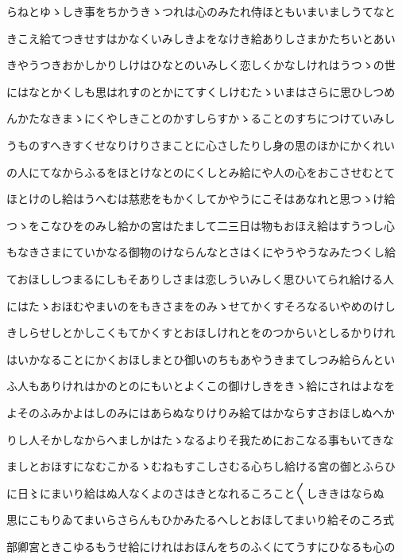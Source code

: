 \documentclass[a4paper,11pt,landscape]{ltjtarticle}
\begin{document}
らねとゆゝしき事をちかうきゝつれは心のみたれ侍ほともいまいましうてなと
\par\medskip
きこえ給てつきせすはかなくいみしきよをなけき給ありしさまかたちいとあい
\par\medskip
きやうつきおかしかりしけはひなとのいみしく恋しくかなしけれはうつゝの世
\par\medskip
にはなとかくしも思はれすのとかにてすくしけむたゝいまはさらに思ひしつめ
\par\medskip
んかたなきまゝにくやしきことのかすしらすかゝることのすちにつけていみし
\par\medskip
うものすへきすくせなりけりさまことに心さしたりし身の思のほかにかくれい
\par\medskip
の人にてなからふるをほとけなとのにくしとみ給にや人の心をおこさせむとて
\par\medskip
ほとけのし給はうへむは慈悲をもかくしてかやうにこそはあなれと思つゝけ給
\par\medskip
つゝをこなひをのみし給かの宮はたまして二三日は物もおほえ給はすうつし心
\par\medskip
もなきさまにていかなる御物のけならんなとさはくにやうやうなみたつくし給
\par\medskip
ておほししつまるにしもそありしさまは恋しういみしく思ひいてられ給ける人
\par\medskip
にはたゝおほむやまいのをもきさまをのみゝせてかくすそろなるいやめのけし
\par\medskip
きしらせしとかしこくもてかくすとおほしけれとをのつからいとしるかりけれ
\par\medskip
はいかなることにかくおほしまとひ御いのちもあやうきまてしつみ給らんとい
\par\medskip
ふ人もありけれはかのとのにもいとよくこの御けしきをきゝ給にされはよなを
\par\medskip
よそのふみかよはしのみにはあらぬなりけりみ給てはかならすさおほしぬへか
\par\medskip
りし人そかしなからへましかはたゝなるよりそ我ためにおこなる事もいてきな
\par\medskip
ましとおほすになむこかるゝむねもすこしさむる心ちし給ける宮の御とふらひ
\par\medskip
に日〻にまいり給はぬ人なくよのさはきとなれるころこと〱しききはならぬ
\par\medskip
思にこもりゐてまいらさらんもひかみたるへしとおほしてまいり給そのころ式
\par\medskip
部卿宮ときこゆるもうせ給にけれはおほんをちのふくにてうすにひなるも心の
\par\medskip
\end{document}
